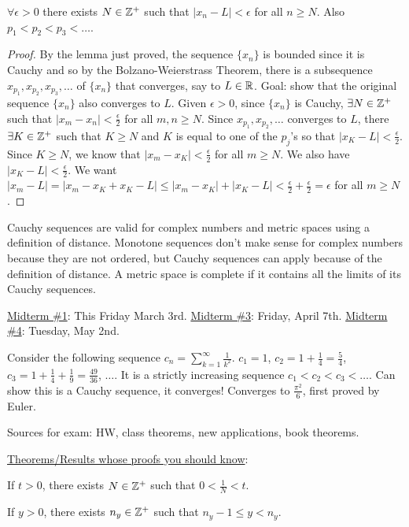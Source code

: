 \documentclass[]{article}
\begin{document}
\begin{note}
	\ul{$\forall \epsilon>0$} there exists $N\in\mathbb{Z}^+$ such that $|x_n-L|<\epsilon$ for all $n\geq N$. Also $p_1<p_2<p_3<\dots$.
\end{note}
\begin{proof}
	By the lemma just proved, the sequence $\{x_n\}$ is bounded since it is Cauchy and so by the Bolzano-Weierstrass Theorem, there is a subsequence $x_{p_1},x_{p_2},x_{p_3},\dots$ of $\{x_n\}$ that converges, say to $L\in\mathbb{R}$. Goal: show that the original sequence $\{x_n\}$ also converges to $L$.
	Given $\epsilon>0$, since $\{x_n\}$ is Cauchy, $\exists N \in\mathbb{Z}^+$ such that $|x_m-x_n|<\frac{\epsilon}{2}$ for all $m,n\geq N$. Since $x_{p_1},x_{p_2},\dots$ converges to $L$, there $\exists K\in\mathbb{Z}^+$ such that $K\geq N$ and $K$ is equal to one of the $p_j$'s so that $|x_K-L|<\frac{\epsilon}{2}$.
	Since \ul{$K\geq N$}, we know that $|x_m-x_K|<\frac{\epsilon}{2}$ for all $m\geq N$. We also have $|x_K-L|<\frac{\epsilon}{2}$. We want $|x_m-L| = |x_m-x_K+x_K-L| \leq |x_m-x_K|+|x_K-L| < \frac{\epsilon}{2} + \frac{\epsilon}{2} = \epsilon$ for all $m\geq N$.
\end{proof}
\begin{remark}
	Cauchy sequences are valid for complex numbers and metric spaces using a definition of distance. Monotone sequences don't make sense for complex numbers because they are not ordered, but Cauchy sequences can apply because of the definition of distance. A metric space is complete if it contains all the limits of its Cauchy sequences.
\end{remark}
\ul{Midterm \#1}: This Friday March 3rd. \ul{Midterm \#3}: Friday, April 7th. \ul{Midterm \#4}: Tuesday, May 2nd.

\begin{example}
	[p.63] Consider the following sequence $c_n = \sum_{k=1}^\infty \frac{1}{k^2}$. $c_1 = 1$, $c_2 = 1+ \frac{1}{4} = \frac{5}{4}$, $c_3 = 1 + \frac{1}{4} + \frac{1}{9} = \frac{49}{36}$, $\dots$. It is a strictly increasing sequence $c_1 < c_2 < c_3 < \dots$. Can show this is a Cauchy sequence, it converges! Converges to $\frac{\pi^2}{6}$, first proved by Euler.
\end{example}

Sources for exam: HW, class theorems, new applications, book theorems.

\ul{Theorems/Results whose proofs you should know}:
\begin{recall}
	 If $t>0$, there exists $N\in\mathbb{Z}^+$ such that $0<\frac{1}{N}<t$.
\end{recall}
\begin{recall}
	 If $y>0$, there exists $n_y\in\mathbb{Z}^+$ such that $n_y-1\leq y <n_y$.
\end{recall}
\end{document}
